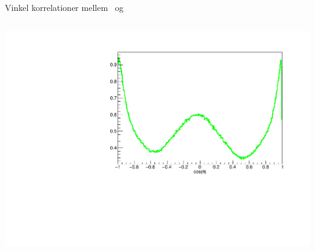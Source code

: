 \begin{frame}{Vinkel korrelationer mellem \al\ og \be}
\begin{columns}
\begin{overprint}
	\includegraphics[width=\columnwidth]{../figures/justData.pdf}
	\end{overprint}	
\end{columns}
\end{frame}

